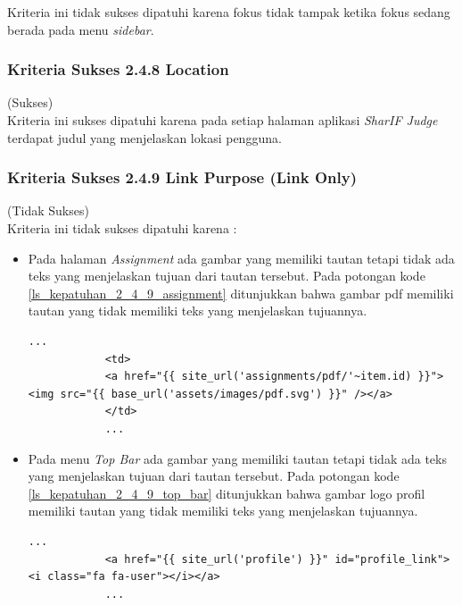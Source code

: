 \documentclass[a4paper,twoside]{article}
\begin{document}
\begin{enumerate}
		Kriteria ini tidak sukses dipatuhi karena fokus tidak tampak ketika fokus sedang berada pada menu \textit{sidebar}.
		
		\subsubsection*{Kriteria Sukses 2.4.8 Location}
		\label{subsubsec:kepatuhan_kriteria_2.4.8}
		(Sukses) \\
		
		Kriteria ini sukses dipatuhi karena pada setiap halaman aplikasi \textit{SharIF Judge} terdapat judul yang menjelaskan lokasi pengguna.
		
		\subsubsection*{Kriteria Sukses 2.4.9 Link Purpose (Link Only)}
		\label{subsubsec:kepatuhan_kriteria_2.4.9}
		(Tidak Sukses) \\
		
		Kriteria ini tidak sukses dipatuhi karena :
		\begin{itemize}
			\item Pada halaman \textit{Assignment} ada gambar yang memiliki tautan tetapi tidak ada teks yang menjelaskan tujuan dari tautan tersebut. Pada potongan kode \ref{ls_kepatuhan_2_4_9_assignment} ditunjukkan bahwa gambar pdf memiliki tautan yang tidak memiliki teks yang menjelaskan tujuannya.
			\begin{lstlisting}[basicstyle=\ttfamily, frame=single,
			columns=fullflexible, keepspaces=true, breaklines=true, label=ls_kepatuhan_2_4_9_assignment, caption=Kriteria Sukses 2.4.9 - Gambar PDF]
			...
			<td>
			<a href="{{ site_url('assignments/pdf/'~item.id) }}"><img src="{{ base_url('assets/images/pdf.svg') }}" /></a>
			</td>
			...
			\end{lstlisting}
			
			\item Pada menu \textit{Top Bar} ada gambar yang memiliki tautan tetapi tidak ada teks yang menjelaskan tujuan dari tautan tersebut. Pada potongan kode \ref{ls_kepatuhan_2_4_9_top_bar} ditunjukkan bahwa gambar logo profil memiliki tautan yang tidak memiliki teks yang menjelaskan tujuannya.
			\begin{lstlisting}[basicstyle=\ttfamily, frame=single,
			columns=fullflexible, keepspaces=true, breaklines=true, label=ls_kepatuhan_2_4_9_top_bar, caption=Kriteria Sukses 2.4.9 - Gambar Logo Profile]
			...
			<a href="{{ site_url('profile') }}" id="profile_link"><i class="fa fa-user"></i></a>
			...
			\end{lstlisting}
			

\end{itemize}
\end{enumerate}
\end{document}
